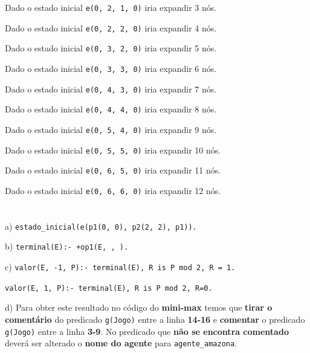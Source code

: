 \documentclass[11pt]{article}
\begin{document}
\hspace{0,45cm}Dado o estado inicial \verb|e(0, 2, 1, 0)| iria expandir 3 nós.

\hspace{0,45cm}Dado o estado inicial \verb|e(0, 2, 2, 0)| iria expandir 4 nós.

\hspace{0,45cm}Dado o estado inicial \verb|e(0, 3, 2, 0)| iria expandir 5 nós.

\hspace{0,45cm}Dado o estado inicial \verb|e(0, 3, 3, 0)| iria expandir 6 nós.

\hspace{0,45cm}Dado o estado inicial \verb|e(0, 4, 3, 0)| iria expandir 7 nós.

\hspace{0,45cm}Dado o estado inicial \verb|e(0, 4, 4, 0)| iria expandir 8 nós.

\hspace{0,45cm}Dado o estado inicial \verb|e(0, 5, 4, 0)| iria expandir 9 nós.

\hspace{0,45cm}Dado o estado inicial \verb|e(0, 5, 5, 0)| iria expandir 10 nós.

\hspace{0,45cm}Dado o estado inicial \verb|e(0, 6, 5, 0)| iria expandir 11 nós.

\hspace{0,45cm}Dado o estado inicial \verb|e(0, 6, 6, 0)| iria expandir 12 nós.

\section{}

\hspace{0,6cm}a) \verb|estado_inicial(e(p1(0, 0), p2(2, 2), p1)).|

b) \verb|terminal(E):- +op1(E, , ).|

c) \verb|valor(E, -1, P):- terminal(E), R is P mod 2, R = 1.|

\hspace{0,45cm}\verb|valor(E, 1, P):- terminal(E), R is P mod 2, R=0.|

d) Para obter este resultado no código do \textbf{mini-max} temos que \textbf{tirar o comentário}
do predicado \verb|g(Jogo)| entre a linha \textbf{14-16} e \textbf{comentar} o predicado
\verb|g(Jogo)| entre a linha \textbf{3-9}. No predicado que \textbf{não se encontra comentado}
deverá ser alterado o \textbf{nome do agente} para \verb|agente_amazona|.
\end{document}
